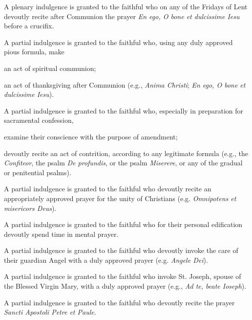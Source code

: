 \documentclass[12pt]{article}
\newcommand{\foreign}[1]{\textsl{#1}}
\begin{document}
\hypertarget{grant8}{}

 A plenary indulgence is granted to the faithful who  on any of the Fridays of Lent devoutly recite after Communion the prayer \foreign{En ego, O bone et dulcissime Iesu} before a crucifix.

 A partial indulgence is granted to the faithful who, using any duly approved pious formula, make

 an act of spiritual communion;

 an act of thanksgiving after Communion (e.g., \foreign{Anima Christi}; \foreign{En ego, O bone et dulcissime Iesu}).

\hypertarget{grant9}{}
A partial indulgence is granted to the faithful who, especially in preparation for sacramental confession,

 examine their conscience with the purpose of amendment;

 devoutly recite an act of contrition, according to any legitimate formula (e.g., the \foreign{Confiteor}, the psalm \foreign{De profundis}, or the psalm \foreign{Miserere}, or any of the gradual or penitential psalms).

\hypertarget{grant11}{}
 A partial indulgence is granted to the faithful who devoutly recite an appropriately approved prayer for the unity of Christians (e.g. \foreign{Omnipotens et misericors Deus}).

A partial indulgence is granted to the faithful who for their personal edification devoutly spend time in mental prayer.

\hypertarget{grant18}{}
A partial indulgence is granted to the faithful who devoutly invoke the care of their guardian Angel with a duly approved prayer (e.g. \foreign{Angele Dei}).

\hypertarget{grant19}{}
A partial indulgence is granted to the faithful who invoke St. Joseph, spouse of the Blessed Virgin Mary, with a duly approved prayer (e.g., \foreign{Ad te, beate Ioseph}).

\hypertarget{grant20}{}
A partial indulgence is granted to the faithful who devoutly recite the prayer \foreign{Sancti Apostoli Petre et Paule}.
\end{document}
